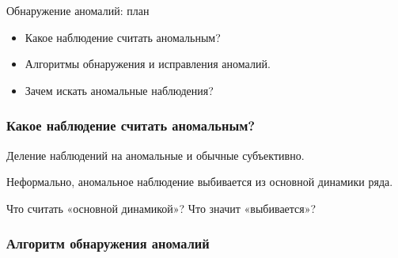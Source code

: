
\begin{frame} %


\end{frame}



\begin{frame}{Обнаружение аномалий: план}
  \begin{itemize}[<+->]
    \item Какое наблюдение считать \alert{аномальным}? 
    \item Алгоритмы \alert{обнаружения и исправления} аномалий.
    \item \alert{Зачем} искать аномальные наблюдения?
  \end{itemize}

\end{frame}


\begin{frame}
  \frametitle{Какое наблюдение считать аномальным?}


  \pause 
  Деление наблюдений на аномальные и обычные \alert{субъективно}.

  \pause
  Неформально, аномальное наблюдение \alert{выбивается} из \alert{основной динамики} ряда. 

  \pause
  Что считать «основной динамикой»? Что значит «выбивается»?

\end{frame}

\begin{frame}
  \frametitle{Алгоритм обнаружения аномалий}

  \begin{itemize}
    



  \end{itemize}
  
\end{frame}


